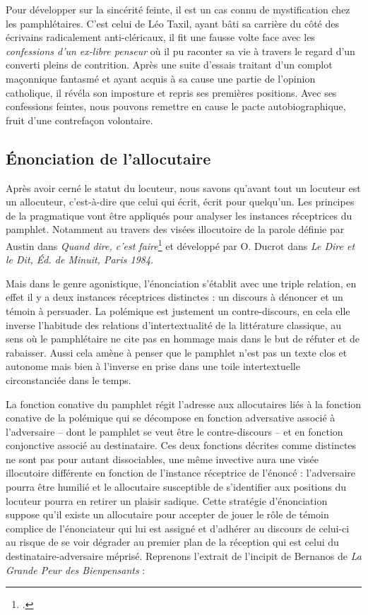 Pour développer sur la sincérité feinte, il est un cas connu de mystification chez les pamphlétaires. C'est celui de Léo Taxil, ayant bâti sa carrière du côté des écrivains radicalement anti-cléricaux, il fit une fausse volte face avec les \textit{confessions d'un ex-libre penseur} où il pu raconter sa vie à travers le regard d'un converti pleins de contrition. Après une suite d'essais traitant d'un complot maçonnique fantasmé et ayant acquis à sa cause une partie de l'opinion catholique, il révéla son imposture et repris ses premières positions. Avec ses confessions feintes, nous pouvons remettre en cause le pacte autobiographique, fruit d'une contrefaçon volontaire.

\subsection{Énonciation de l'allocutaire}

Après avoir cerné le statut du locuteur, nous savons qu'avant tout un locuteur est un allocuteur, c'est-à-dire que celui qui écrit, écrit pour quelqu'un. Les principes de la pragmatique vont être appliqués pour analyser les instances réceptrices du pamphlet. Notamment au travers des visées illocutoire de la parole définie par Austin dans \textit{Quand dire, c'est faire}\footcites{austin_quand_1970} et développé par O. Ducrot dans \textit{Le Dire et le Dit, Éd. de Minuit, Paris 1984}.

Mais dans le genre agonistique, l'énonciation s'établit avec une triple relation, en effet il y a deux instances réceptrices distinctes : un discours à dénoncer et un témoin à persuader.
La polémique est justement un contre-discours, en cela elle inverse l'habitude des relations d'intertextualité de la littérature classique, au sens où le pamphlétaire ne cite pas en hommage mais dans le but de réfuter et de rabaisser. Aussi cela amène à penser que le pamphlet n'est pas un texte clos et autonome mais bien à l'inverse en prise dans une toile intertextuelle circonstanciée dans le temps. 

La fonction conative du pamphlet régit l'adresse aux allocutaires liés à la fonction conative de la polémique qui se décompose en fonction adversative associé à l'adversaire – dont le pamphlet se veut être le contre-discours – et en fonction conjonctive associé au destinataire. Ces deux fonctions décrites comme distinctes ne sont pas pour autant dissociables, une même invective aura une visée illocutoire différente en fonction de l'instance réceptrice de l'énoncé : l'adversaire pourra être humilié et le allocutaire susceptible de s'identifier aux positions du locuteur pourra en retirer un plaisir sadique. Cette stratégie d'énonciation suppose qu'il existe un allocutaire pour accepter de jouer le rôle de témoin complice de l'énonciateur qui lui est assigné et d'adhérer au discours de celui-ci au risque de se voir dégrader au premier plan de la réception qui est celui du destinataire-adversaire méprisé.
Reprenons l'extrait de l'incipit de Bernanos de \textit{La Grande Peur des Bienpensants} : \\
	
